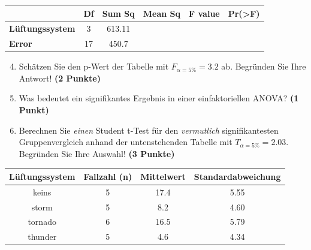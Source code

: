 \documentclass[a4paper, 9pt]{scrartcl}\usepackage[]{graphicx}\usepackage[]{xcolor}
\newenvironment{knitrout}{}{} %
\begin{document}
\vspace{1Ex}

\begin{center}
  \Large
  \begin{tabular}{lccccp{3cm}}
\toprule
     & \textbf{Df} & \textbf{Sum Sq} & \textbf{Mean Sq} & \textbf{F value} & \textbf{Pr(>F)} \strut\\
    \midrule
   \textbf{Lüftungssystem}  & 3 & 613.11 &  &  &  \strut\\
   \textbf{Error}  & 17 & 450.7 &  &  &  \strut\\
\bottomrule
  \end{tabular}
\end{center}

\vspace{1Ex}

\begin{enumerate}
  \setcounter{enumi}{3}
\item Schätzen Sie den p-Wert der Tabelle mit $F_{\alpha = 5\%} = 3.2$ ab. Begründen Sie Ihre Antwort! \textbf{(2 Punkte)}
\item Was bedeutet ein signifikantes Ergebnis in einer einfaktoriellen ANOVA? \textbf{(1 Punkt)}
\item Berechnen Sie \textit{einen} Student t-Test für den \textit{vermutlich} signifikantesten Gruppenvergleich anhand der untenstehenden Tabelle mit $T_{\alpha = 5\%} = 2.03$. Begründen Sie Ihre Auswahl! \textbf{(3 Punkte)}
\end{enumerate}


\begin{knitrout}
\color{fgcolor}\begin{table}[!h]
\centering\begingroup\fontsize{11}{13}\selectfont

\begin{tabular}{cccc}
\toprule
\textbf{Lüftungssystem} & \textbf{Fallzahl (n)} & \textbf{Mittelwert} & \textbf{Standardabweichung}\\
\midrule
keins & 5 & 17.4 & 5.55\\
storm & 5 & 8.2 & 4.60\\
tornado & 6 & 16.5 & 5.79\\
thunder & 5 & 4.6 & 4.34\\
\bottomrule
\end{tabular}
\endgroup{}
\end{table}

\end{knitrout}
\end{document}

